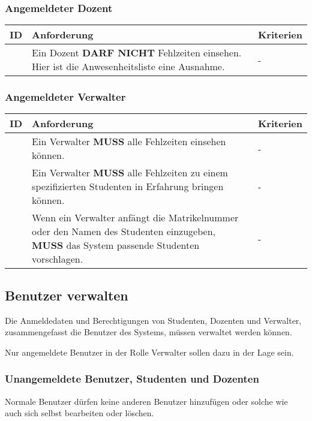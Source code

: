 \vspace{12pt}

\subsubsection{Angemeldeter Dozent}
\begin{tabular} {|p{}|p{}|p{}|}
	\hline
	ID & Anforderung & Kriterien \\
	\hline
	\printfreqnr
	& Ein Dozent \textbf{DARF NICHT} Fehlzeiten einsehen. Hier ist die Anwesenheitsliste eine Ausnahme. 
	& - \\
	\hline
\end{tabular}

\vspace{12pt}

\subsubsection{Angemeldeter Verwalter}
\begin{tabular} {|p{}|p{}|p{}|}
	\hline
	ID & Anforderung & Kriterien \\
	\hline
	\printfreqnr
	& Ein Verwalter \textbf{MUSS} alle Fehlzeiten einsehen können. 
	& - \\
	\hline
	\printfreqnr
	& Ein Verwalter \textbf{MUSS} alle Fehlzeiten zu einem spezifizierten Studenten in Erfahrung bringen können.
	& - \\ 
	\hline
	\printfreqnr
	& Wenn ein Verwalter anfängt die Matrikelnummer oder den Namen des Studenten einzugeben, \textbf{MUSS} das System passende Studenten vorschlagen.
	& - \\ 
	\hline
\end{tabular}

\newpage

\subsection{Benutzer verwalten}
Die Anmeldedaten und Berechtigungen von Studenten, Dozenten und Verwalter, zusammengefasst die Benutzer des Systems, müssen verwaltet werden können.

Nur angemeldete Benutzer in der Rolle Verwalter sollen dazu in der Lage sein.

\vspace{12pt}

\subsubsection{Unangemeldete Benutzer, Studenten und Dozenten}
Normale Benutzer dürfen keine anderen Benutzer hinzufügen oder solche wie auch sich selbst bearbeiten oder löschen.

